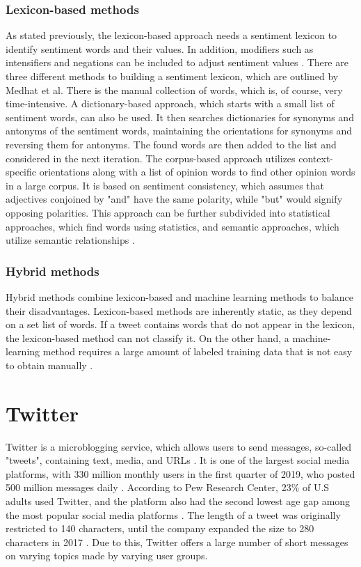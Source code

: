 \subsubsection{Lexicon-based methods}
As stated previously, the lexicon-based approach needs a sentiment lexicon to identify sentiment words and their values. In addition, modifiers such as intensifiers and negations can be included to adjust sentiment values \cite{liu_2015}. There are three different methods to building a sentiment lexicon, which are outlined by Medhat et al. There is the manual collection of words, which is, of course, very time-intensive. A dictionary-based approach, which starts with a small list of sentiment words, can also be used. It then searches dictionaries for synonyms and antonyms of the sentiment words, maintaining the orientations for synonyms and reversing them for antonyms. The found words are then added to the list and considered in the next iteration. The corpus-based approach utilizes context-specific orientations along with a list of opinion words to find other opinion words in a large corpus. It is based on sentiment consistency, which assumes that adjectives conjoined by "and" have the same polarity, while "but" would signify opposing polarities. This approach can be further subdivided into statistical approaches, which find words using statistics, and semantic approaches, which utilize semantic relationships \cite{MEDHAT20141093}.

\subsubsection{Hybrid methods}
Hybrid methods combine lexicon-based and machine learning methods to balance their disadvantages. Lexicon-based methods are inherently static, as they depend on a set list of words. If a tweet contains words that do not appear in the lexicon, the lexicon-based method can not classify it. On the other hand, a machine-learning method requires a large amount of labeled training data that is not easy to obtain manually \cite{DBLP:journals/csur/GiachanouC16}.


\section{Twitter}
Twitter is a microblogging service, which allows users to send messages, so-called "tweets", containing text, media, and URLs \cite{DBLP:journals/csur/GiachanouC16}. It is one of the largest social media platforms, with 330 million monthly users in the first quarter of 2019, who posted 500 million messages daily \cite{twitter:users}. According to Pew Research Center, 23\% of U.S adults used Twitter, and the platform also had the second lowest age gap among the most popular social media platforms \cite{pew:socialmedia}. The length of a tweet was originally restricted to 140 characters, until the company expanded the size to 280 characters in 2017 \cite{twitter:characters}. Due to this, Twitter offers a large number of short messages on varying topics made by varying user groups. 

